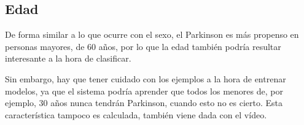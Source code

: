 \subsection{Edad}
De forma similar a lo que ocurre con el sexo, el Parkinson es más propenso en personas mayores, de 60 años, por lo que la edad también podría resultar interesante a la hora de clasificar.

Sin embargo, hay que tener cuidado con los ejemplos a la hora de entrenar modelos, ya que el sistema podría aprender que todos los menores de, por ejemplo, 30 años nunca tendrán Parkinson, cuando esto no es cierto. Esta característica tampoco es calculada, también viene dada con el vídeo.

